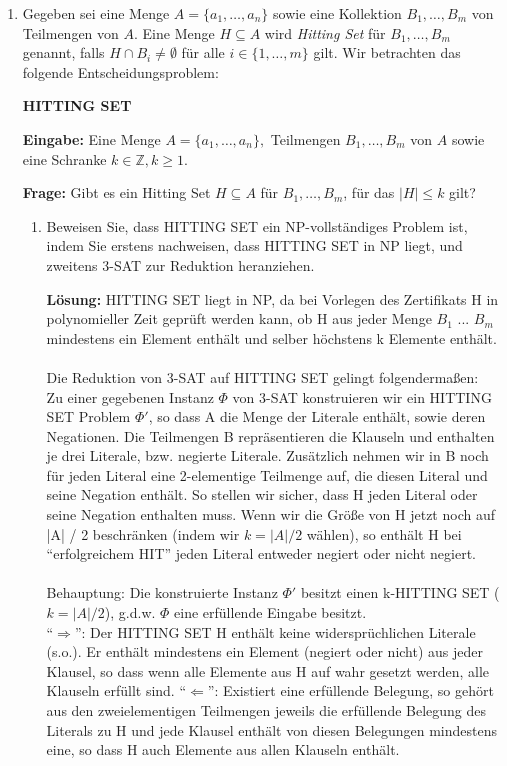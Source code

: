\documentclass[12pt,a4paper]{scrartcl}
\newcommand{\prob}[1]{\vspace{.5\baselineskip}\begin{addmargin}[15pt]{0pt}\textbf{#1}\end{addmargin}}
\newcommand{\ein}[1]{\vspace{.5\baselineskip}\begin{addmargin}[15pt]{0pt}\textbf{Eingabe: }#1\end{addmargin}}
\newcommand{\fra}[1]{\vspace{.5\baselineskip}\begin{addmargin}[15pt]{0pt}\textbf{Frage: }#1\end{addmargin}}
\newcommand{\loesung}[1]{\vspace{.5\baselineskip}\begin{addmargin}[0pt]{0pt}\textbf{Lösung: }#1\end{addmargin}}
\begin{document}
\begin{enumerate}
\item Gegeben sei eine Menge $A = \{a_1,\ldots,a_n\}$ sowie eine Kollektion $B_1,\ldots,B_m$ von Teilmengen von $A$. Eine Menge $H \subseteq A$ wird \emph{Hitting Set} für $B_1,\ldots,B_m$ genannt, falls $H \cap B_i \neq \emptyset$ für alle $i \in \{1,\ldots,m\}$ gilt. Wir betrachten das folgende Entscheidungsproblem:

	\prob{HITTING SET}
	\ein{Eine Menge $A = \{a_1,\ldots,a_n\},$ Teilmengen $B_1,\ldots,B_m$ von $A$ sowie eine Schranke $k \in \mathds{Z}, k \geq 1$.}
	\fra{Gibt es ein Hitting Set $H \subseteq A$ für $B_1,\ldots,B_m$, für das $|H| \leq k$ gilt?}
	\begin{enumerate}
	\item Beweisen Sie, dass HITTING SET ein NP-vollständiges Problem ist, indem Sie erstens nachweisen, dass HITTING SET in NP liegt, und zweitens 3-SAT zur Reduktion heranziehen.
	
	\loesung{
	HITTING SET liegt in NP, da bei Vorlegen des Zertifikats H in polynomieller Zeit geprüft werden kann, ob H aus jeder Menge $B_1$ ... $B_m$ mindestens ein Element enthält und selber höchstens k Elemente enthält.\\  \\
	Die Reduktion von 3-SAT auf HITTING SET gelingt folgendermaßen:\\
	Zu einer gegebenen Instanz $\Phi$ von 3-SAT konstruieren wir ein HITTING SET Problem $\Phi'$, so dass A die Menge der Literale enthält, sowie deren Negationen. Die Teilmengen B repräsentieren die Klauseln und enthalten je drei Literale, bzw. negierte Literale. Zusätzlich nehmen wir in B noch für jeden Literal eine 2-elementige Teilmenge auf, die diesen Literal und seine Negation enthält. So stellen wir sicher, dass H jeden Literal oder seine Negation enthalten muss. Wenn wir die Größe von H jetzt noch auf |A| / 2 beschränken (indem wir $k = |A| / 2$ wählen), so enthält H bei ``erfolgreichem HIT'' jeden Literal entweder negiert oder nicht negiert.\\ \\
	Behauptung: Die konstruierte Instanz $\Phi'$ besitzt einen k-HITTING SET ($k = |A| / 2$), g.d.w. $\Phi$ eine erfüllende Eingabe besitzt.\\
	``$\Rightarrow$'': Der HITTING SET H enthält keine widersprüchlichen Literale (s.o.). Er enthält mindestens ein Element (negiert oder nicht) aus jeder Klausel, so dass wenn alle Elemente aus H auf wahr gesetzt werden, alle Klauseln erfüllt sind.
	``$\Leftarrow$'': Existiert eine erfüllende Belegung, so gehört aus den zweielementigen Teilmengen jeweils die erfüllende Belegung des Literals zu H und jede Klausel enthält von diesen Belegungen mindestens eine, so dass H auch Elemente aus allen Klauseln enthält.\\
	
}
\end{enumerate}
\end{enumerate}
\end{document}
